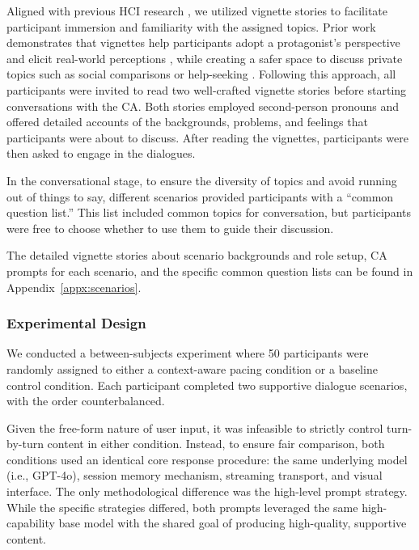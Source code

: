 Aligned with previous HCI research \cite{10.1145/3706598.3713737, passalacqua2025safeguarding}, we utilized vignette stories to facilitate participant immersion and familiarity with the assigned topics. Prior work demonstrates that vignettes help participants adopt a protagonist's perspective and elicit real-world perceptions \cite{10.1145/3544548.3581231, lutz2021privacy, neuhaus2024mimic}, while creating a safer space to discuss private topics such as social comparisons \cite{10.1145/3706598.3713737} or help-seeking \cite{liu2022exploring}. Following this approach, all participants were invited to read two well-crafted vignette stories before starting conversations with the CA. Both stories employed second-person pronouns and offered detailed accounts of the backgrounds, problems, and feelings that participants were about to discuss. After reading the vignettes, participants were then asked to engage in the dialogues.

In the conversational stage, to ensure the diversity of topics and avoid running out of things to say, different scenarios provided participants with a ``common question list.'' This list included common topics for conversation, but participants were free to choose whether to use them to guide their discussion. 

The detailed vignette stories about scenario backgrounds and role setup, CA prompts for each scenario, and the specific common question lists can be found in Appendix~\ref{appx:scenarios}.


\subsubsection{Experimental Design}
We conducted a between-subjects experiment where 50 participants were randomly assigned to either a context-aware pacing condition or a baseline control condition. Each participant completed two supportive dialogue scenarios, with the order counterbalanced.

Given the free-form nature of user input, it was infeasible to strictly control turn-by-turn content in either condition. Instead, to ensure fair comparison, both conditions used an identical core response procedure: the same underlying model (i.e., GPT-4o), session memory mechanism, streaming transport, and visual interface. The only methodological difference was the high-level prompt strategy. While the specific strategies differed, both prompts leveraged the same high-capability base model with the shared goal of producing high-quality, supportive content.

